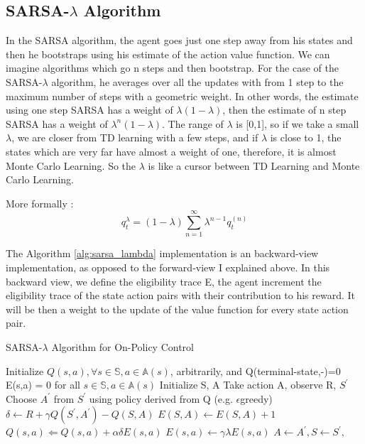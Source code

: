 \documentclass[12pt,a4paper]{article}
\begin{document}
\subsection{SARSA-$\lambda$ Algorithm}
In the SARSA algorithm, the agent goes just one step away from his states and then he bootstraps using his estimate of the action value function. We can imagine algorithms which go n steps and then bootstrap. For the case of the SARSA-$\lambda$ algorithm, he averages over all the updates with from 1 step to the maximum number of steps with a geometric weight. In other words, the estimate using one step SARSA has a weight of $\lambda(1-\lambda)$, then the estimate of n step SARSA has a weight of $\lambda^n(1-\lambda)$. The range of $\lambda$ is [0,1], so if we take a small $\lambda$, we are closer from TD learning with a few steps, and if $\lambda$ is close to 1, the states which are very far have almost a weight of one, therefore, it is almost Monte Carlo Learning. So the $\lambda$ is like a cursor between TD Learning and Monte Carlo Learning.

More formally : 
\[q_{t}^{\lambda} = (1-\lambda)\sum_{n=1}^{\infty}{\lambda^{n-1}q_{t}^{(n)}}\]

The Algorithm \ref{alg:sarsa_lambda} implementation is an backward-view implementation, as opposed to the forward-view I explained above. In this backward view, we define the eligibility trace E, the agent increment the eligibility trace of the state action pairs with their contribution to his reward. It will be then a weight to the update of the value function for every state action pair.

\begin{algorithm}
\caption{SARSA-$\lambda$ Algorithm for On-Policy Control}
\label{alg:sarsa_lambda}
\begin{algorithmic}[1]
\State Initialize $Q(s,a),\forall s \in \mathbb{S}, a \in \mathbb{A}(s)$, arbitrarily, and Q(terminal-state,-)=0
\State E(s,a) = 0 for all $s\in\mathbb{S}, a\in\mathbb{A}(s)$
\State Initialize S, A
\State Take action A, observe R, $S^{\prime}$
\State Choose $A^{\prime}$ from $S^{\prime}$ using policy derived from Q (e.g. $\epsilon$greedy)
\State $\delta \leftarrow R + \gamma Q(S^{\prime},A^{\prime}) - Q(S,A) $
\State $E(S,A) \leftarrow E(S,A) + 1$ 
\State $Q(s,a) \Leftarrow Q(s,a) + \alpha\delta E(s,a)$
\State $E(s,a) \leftarrow \gamma \lambda E(s,a)$
\EndFor
\State $A \leftarrow A^{\prime}, S \leftarrow S^{\prime},$
\EndFor
\EndFor
\end{algorithmic}
\end{algorithm}
\end{document}
